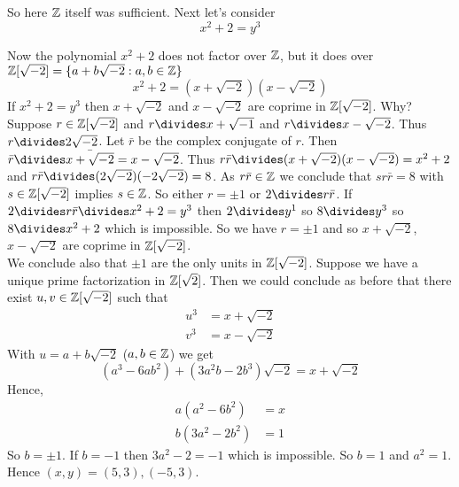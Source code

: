 \documentclass[NumTh.tex]{subfiles}
\begin{document}
So here $\mathbb{Z}$ itself was sufficient. Next let's consider
\[ x^2 + 2 = y^3 \]

Now the polynomial $x^2 + 2$  does not factor over $\mathbb{Z}$, but it does over $\mathbb{Z}[\sqrt{-2}] = \{a + b \sqrt{-2}: a,b \in \mathbb{Z}\}$
\[ x^2 + 2 = (x + \sqrt{-2}) (x - \sqrt{-2}) \]
If $x^2+2 = y^3$ then $x + \sqrt{-2}$ and $x - \sqrt{-2}$ are coprime in $\mathbb{Z}[\sqrt{-2}]$.
Why?
Suppose $r \in \mathbb{Z}[\sqrt{-2}]$ and $r \divides x +\sqrt{-1}$ and $r \divides x - \sqrt{-2}$.
Thus $r \divides 2 \sqrt{-2}$.
Let $\bar{r}$ be the complex conjugate of $r$.
Then $\bar{r} \divides \bar{x+ \sqrt{-2}} = x - \sqrt{-2}$.
Thus $r \bar{r} \divides (x + \sqrt{-2})(x-\sqrt{-2}) = x^2 + 2$ and $r \bar{r} \divides (2 \sqrt{-2})(-2 \sqrt{-2}) = 8$.
As $r \bar{r} \in \mathbb{Z}$ we conclude that $s r \bar{r} = 8$ with $s \in \mathbb{Z}[\sqrt{-2}]$ implies $s \in \mathbb{Z}$.
So either $r = \pm 1$ or $2 \divides r \bar{r}$.
If $2 \divides r \bar{r} \divides x^2 + 2 = y^3$ then $2 \divides y^1$ so $8 \divides y^3$ so $8 \divides x^2 + 2$ which is impossible.
So we have $r = \pm 1$ and so $x + \sqrt{-2}$, $x - \sqrt{-2}$ are coprime in $\mathbb{Z}[\sqrt{-2}]$. \\
We conclude also that  $\pm 1$ are the only units in $\mathbb{Z}[\sqrt{-2}]$.
Suppose we have a unique prime factorization in $\mathbb{Z}[\sqrt{2}]$.
Then we could conclude as before that there exist $u,v \in \mathbb{Z}[\sqrt{-2}]$ such that
\begin{align*}
  u^3 &= x + \sqrt{-2}\\
  v^3 &= x - \sqrt{-2}
\end{align*}
With $u = a +b \sqrt{-2}$ ($a,b\in \mathbb{Z}$) we get
\[ (a^3 - 6ab^2) + (3a^2b - 2b^3) \sqrt{-2} = x + \sqrt{-2} \]
Hence,
\begin{align*}
  a(a^2 - 6b^2) &= x\\
  b(3a^2 - 2b^2) &= 1
\end{align*}
So $b = \pm 1$. If $b = -1$ then $3a^2 -2 = -1$ which is impossible.
So $b = 1$ and $a^2 = 1$.
Hence $(x,y) = (5,3), (-5,3)$.
\end{document}
